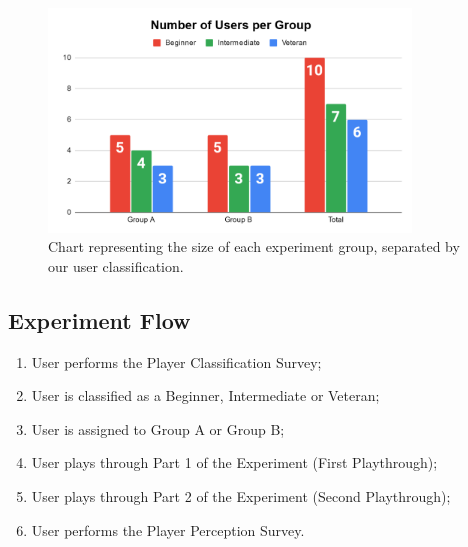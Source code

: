 \begin{figure}[!ht]
    \begin{center}
    \caption{Chart representing the size of each experiment group, separated by our user classification.}
        \includegraphics[width=26em]{figures/fig-user-groups.png}
    \end{center}
    \label{fig:user-group-sizes}
\end{figure}

\subsection{Experiment Flow}


\begin{enumerate}
    \item{User performs the Player Classification Survey;}
    \item{User is classified as a Beginner, Intermediate or Veteran;}
    \item{User is assigned to Group A or Group B;}
    \item{User plays through Part 1 of the Experiment (First Playthrough);}
    \item{User plays through Part 2 of the Experiment (Second Playthrough);}
    \item{User performs the Player Perception Survey.}
\end{enumerate}


